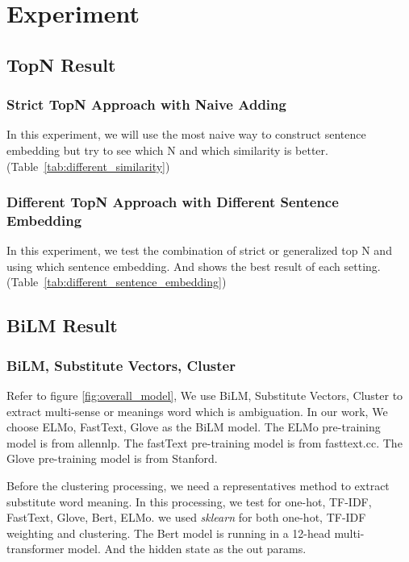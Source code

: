 \section{Experiment}
\label{sec:experiment}

\subsection*{TopN Result}

\subsubsection*{Strict TopN Approach with Naive Adding}

In this experiment, we will use the most naive way to construct sentence embedding but try to see which N and which similarity is better. (Table~\ref{tab:different_similarity})




\subsubsection*{Different TopN Approach with Different Sentence Embedding}

In this experiment, we test the combination of strict or generalized top N and using which sentence embedding. And shows the best result of each setting. (Table~\ref{tab:different_sentence_embedding})



\subsection*{BiLM Result}

\subsubsection*{BiLM, Substitute Vectors, Cluster}
Refer to figure \ref{fig:overall_model}, We use BiLM, Substitute Vectors, Cluster to extract multi-sense or meanings word which is ambiguation.
In our work, We choose ELMo, FastText, Glove as the BiLM model.
The ELMo pre-training model is from allennlp.
The fastText pre-training model is from fasttext.cc.
The Glove\cite{pennington2014glove} pre-training model is from Stanford. 

Before the clustering processing, we need a representatives method to extract substitute word meaning.
In this processing, we test for one-hot, TF-IDF, FastText, Glove, Bert, ELMo.
we used \emph{sklearn} for both one-hot, TF-IDF weighting and clustering.
The Bert model is running in a 12-head multi-transformer model. 
And the hidden state as the out params.

